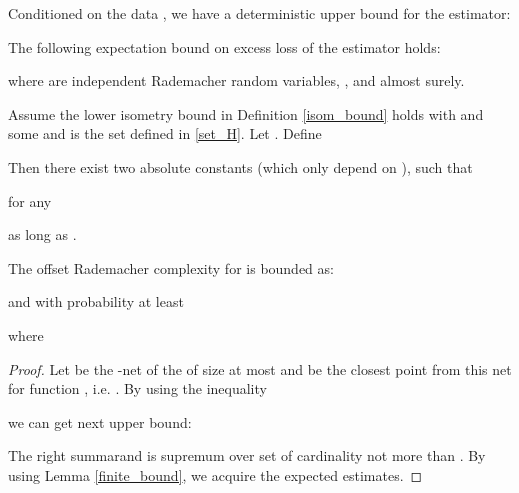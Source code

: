         \begin{corollary}[Corollary 3]
        Conditioned on the data , we have a deterministic upper bound for the  estimator:
        
        
        
    \end{corollary}
    \begin{theorem}[Theorem 4]
    \label{loss_expectation}
        The following expectation bound on excess loss of the  estimator holds:
        
        where  are independent Rademacher random variables, ,  and  almost surely.
    \end{theorem}
    
    \begin{theorem}[Theorem 7]
    \label{loss_probability}
        Assume the lower isometry bound in Definition \ref{isom_bound} holds with  and some  and  is the set defined in \ref{set_H}. Let .
        Define
        
        Then there exist two absolute constants  (which only depend on ), such that
        
        for any
        
        as long as .\\
    \end{theorem}

\begin{lemma}[Lemma 15]
\label{bound_complexity}
    The offset Rademacher complexity for  is bounded as:
    
    and with probability at least 
    
    where  
    
\end{lemma}
\begin{proof}
        Let  be the  -net of the  of size at most 
        and  be the closest point from this net for function , i.e. .
        By using the inequality
        
        we can get next upper bound:
        
    The right summarand is supremum over set of cardinality not more than .
    By using Lemma \ref{finite_bound}, we acquire the expected estimates.
\end{proof}


